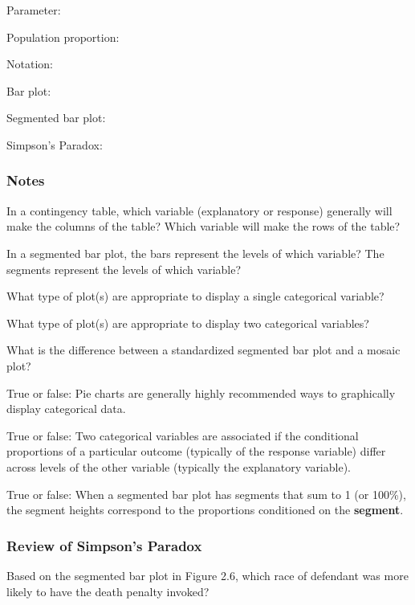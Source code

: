 \documentclass[
]{report}
\newcommand{\rgs}{\vspace{12pt}} %
\newcommand{\rgi}{\hspace{24pt}}  %
\begin{document}
Parameter:
\rgs

\rgi Population proportion:
\rgs

\rgi \rgi Notation:
\rgs

Bar plot:
\rgs

Segmented bar plot:
\rgs

Simpson's Paradox:
\rgs

\hypertarget{notes-4}{%
\subsubsection*{Notes}\label{notes-4}}

In a contingency table, which variable (explanatory or response) generally will make the columns of the table? Which variable will make the rows of the table?
\rgs

In a segmented bar plot, the bars represent the levels of which variable? The segments represent the levels of which variable?
\rgs

What type of plot(s) are appropriate to display a single categorical variable?
\rgs

What type of plot(s) are appropriate to display two categorical variables?
\rgs

What is the difference between a standardized segmented bar plot and a mosaic plot?
\rgs

True or false: Pie charts are generally highly recommended ways to graphically display categorical data.

True or false: Two categorical variables are associated if the conditional proportions of a particular outcome (typically of the response variable) differ across levels of the other variable (typically the explanatory variable).

True or false: When a segmented bar plot has segments that sum to 1 (or 100\%), the segment heights correspond to the proportions conditioned on the \textbf{segment}.

\hypertarget{review-of-simpsons-paradox}{%
\subsubsection*{Review of Simpson's Paradox}\label{review-of-simpsons-paradox}}

Based on the segmented bar plot in Figure 2.6, which race of defendant was more likely to have the death penalty invoked?
\rgs
\end{document}
